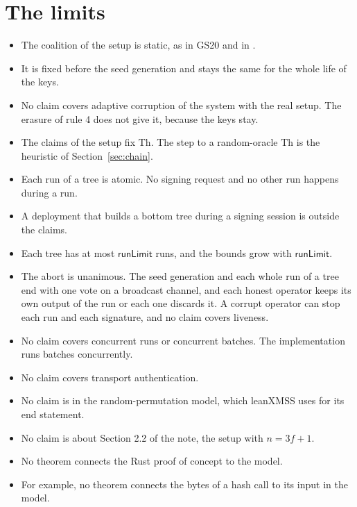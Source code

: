 \documentclass[11pt]{article}
\newcommand{\Th}{\mathrm{Th}}
\begin{document}
\section{The limits}\label{sec:limits}
\begin{itemize}
\item The coalition of the setup is static, as in GS20 and in \cite{GJM+21}.
\item It is fixed before the seed generation and stays the same for the whole life of the keys.
\item No claim covers adaptive corruption of the system with the real setup. The erasure of rule 4
does not give it, because the keys stay.
\item The claims of the setup fix $\Th$. The step to a random-oracle $\Th$ is the heuristic of
Section~\ref{sec:chain}.
\item Each run of a tree is atomic. No signing request and no other run happens during a run.
\item A deployment that builds a bottom tree during a signing session is outside the claims.
\item Each tree has at most $\mathsf{runLimit}$ runs, and the bounds grow with $\mathsf{runLimit}$.
\item The abort is unanimous. The seed generation and each whole run of a tree end with one vote on
a broadcast channel, and each honest operator keeps its own output of the run or each one discards
it. A corrupt operator can stop each run and each signature, and no claim covers liveness.
\item No claim covers concurrent runs or concurrent batches. The implementation runs batches
concurrently.
\item No claim covers transport authentication.
\item No claim is in the random-permutation model, which leanXMSS uses for its end statement.
\item No claim is about Section 2.2 of the note, the setup with $n=3f+1$.
\item No theorem connects the Rust proof of concept to the model.
\item For example, no theorem connects the bytes of a hash call to its input in the model.
\end{itemize}

\appendix
\end{document}
